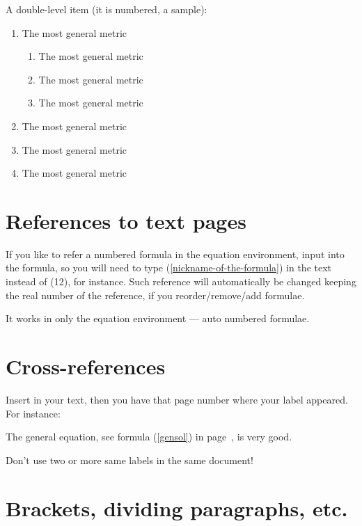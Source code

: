 \documentclass[twoside,final]{article}
\begin{document}
{A double-level item (it is numbered, a sample):
\begin{enumerate}
\item The most general metric
  \begin{enumerate}
  \item The most general metric
  \item The most general metric
  \item The most general metric
  \end{enumerate}
\item The most general metric
\item The most general metric
\item The most general metric
\end{enumerate}


\section{References to text pages}


If you like to refer a numbered formula in the {equation} environment, input \label{nickname-of-the-formula} into the formula, so you will need to type (\ref{nickname-of-the-formula}) in the text instead of (12), for instance. Such reference will automatically be changed keeping the real number of the reference, if you reorder/remove/add formulae.

It works in only the {equation} environment --- auto numbered formulae.



\section{Cross-references}


Insert \label{myidea} in your text, then you have that page number where your label \pageref{myidea} appeared. For instance:

The general equation, see formula (\ref{gensol}) in page~\pageref{gensol}, is very good.

Don't use two or more same labels in the same document!



\section{Brackets, dividing paragraphs, etc.}


}
\end{document}
